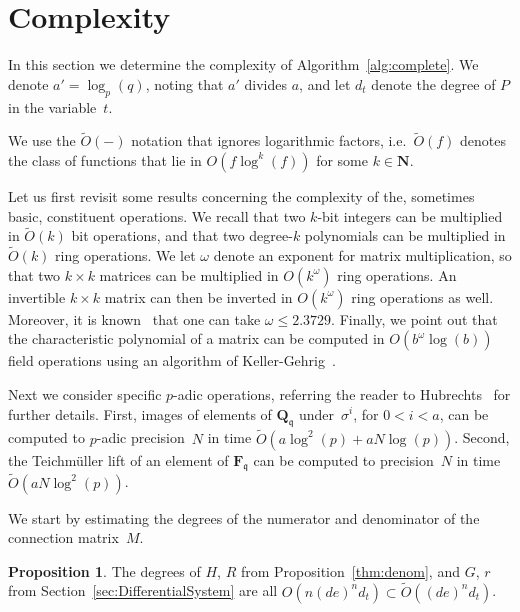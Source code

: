\documentclass[a4paper,11pt]{article}
\numberwithin{equation}{section}
\newcommand{\NN}{\mathbf{N}} %
\newcommand{\QQ}{\mathbf{Q}} %
\newcommand{\FF}{\mathbf{F}} %
\providecommand{\BigOh}{O}          %
\providecommand{\SoftOh}{\tilde{O}} %
\theoremstyle{definition}
\newtheorem{prop}[thm]{Proposition}
\begin{document}

\section{Complexity}

\label{sec:Complexity}

In this section we determine the complexity of Algorithm~\ref{alg:complete}.
We denote $a' = \log_p(q)$, noting that $a'$ divides $a$, 
and let $d_t$ denote the degree of $P$ in the variable~$t$. 

We use the $\SoftOh(-)$ notation that ignores logarithmic factors, 
i.e.\ $\SoftOh(f)$ denotes the class of functions 
that lie in $\BigOh(f \log^k(f))$ for some $k \in \NN$.

Let us first revisit some results concerning the complexity of the, 
sometimes basic, constituent operations.  We recall that two $k$-bit 
integers can be multiplied in $\SoftOh(k)$ bit operations, and that 
two degree-$k$ polynomials can be multiplied in $\SoftOh(k)$ ring 
operations.  We let $\omega$ denote an exponent for matrix 
multiplication, so that two $k \times k$ matrices can be multiplied 
in $\BigOh(k^{\omega})$ ring operations. An invertible $k \times k$ matrix 
can then be inverted in $\BigOh(k^{\omega})$ ring operations as well. 
Moreover, it is known~\citep{Williams2012} that one can take $\omega \leq 2.3729$.  
Finally, we point out that the characteristic polynomial of a matrix can be 
computed in $\BigOh(b^{\omega} \log(b))$ field operations using 
an algorithm of Keller-Gehrig~\citep{KellerGehrig1985}.

Next we consider specific $p$-adic operations, referring the reader to 
Hubrechts~\citep{Hubrechts2010} for further details.  First, images of elements 
of $\QQ_{\mathfrak{q}}$ under~$\sigma^i$, for $0 < i < a$, can be computed to 
$p$-adic precision~$N$ in time $\SoftOh(a \log^2(p) + a N \log(p))$.  Second, 
the Teichm\"uller lift of an element of $\FF_{\mathfrak{q}}$ can be computed 
to precision~$N$ in time $\SoftOh(a N \log^2(p))$.

We start by estimating the degrees of the numerator and denominator of the
connection matrix~$M$.

\begin{prop}
The degrees of $H$, $R$ from Proposition~\ref{thm:denom}, and
$G$, $r$ from Section~\ref{sec:DifferentialSystem} are all
$\BigOh(n(de)^n d_t) \subset \SoftOh((de)^n d_t)$.
\end{prop}
\end{document}
